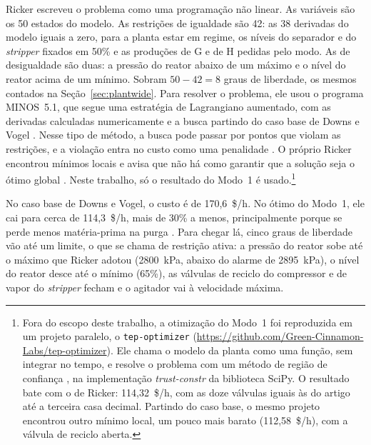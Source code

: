 \begin{figure}[htbp]
	\label{fig:otimizar}
\end{figure}

Ricker escreveu o problema como uma programação não linear. As variáveis são os 50 estados do modelo. As restrições de igualdade são 42: as 38 derivadas do modelo iguais a zero, para a planta estar em regime, os níveis do separador e do \textit{stripper} fixados em 50\% e as produções de G e de H pedidas pelo modo. As de desigualdade são duas: a pressão do reator abaixo de um máximo e o nível do reator acima de um mínimo. Sobram $50 - 42 = 8$ graus de liberdade, os mesmos contados na Seção~\ref{sec:plantwide}. Para resolver o problema, ele usou o programa MINOS~5.1, que segue uma estratégia de Lagrangiano aumentado, com as derivadas calculadas numericamente e a busca partindo do caso base de Downs e Vogel \cite{Ricker1995}. Nesse tipo de método, a busca pode passar por pontos que violam as restrições, e a violação entra no custo como uma penalidade \cite{Nocedal1999}. O próprio Ricker encontrou mínimos locais e avisa que não há como garantir que a solução seja o ótimo global \cite{Ricker1995}. Neste trabalho, só o resultado do Modo~1 é usado.\footnote{Fora do escopo deste trabalho, a otimização do Modo~1 foi reproduzida em um projeto paralelo, o \texttt{tep-optimizer} (\url{https://github.com/Green-Cinnamon-Labs/tep-optimizer}). Ele chama o modelo da planta como uma função, sem integrar no tempo, e resolve o problema com um método de região de confiança \cite{Nocedal1999}, na implementação \textit{trust-constr} da biblioteca SciPy. O resultado bate com o de Ricker: 114,32~\$/h, com as doze válvulas iguais às do artigo até a terceira casa decimal. Partindo do caso base, o mesmo projeto encontrou outro mínimo local, um pouco mais barato (112,58~\$/h), com a válvula de reciclo aberta.}

No caso base de Downs e Vogel, o custo é de 170,6~\$/h. No ótimo do Modo~1, ele cai para cerca de 114,3~\$/h, mais de 30\% a menos, principalmente porque se perde menos matéria-prima na purga \cite{Ricker1995}. Para chegar lá, cinco graus de liberdade vão até um limite, o que se chama de restrição ativa: a pressão do reator sobe até o máximo que Ricker adotou (2800~kPa, abaixo do alarme de 2895~kPa), o nível do reator desce até o mínimo (65\%), as válvulas de reciclo do compressor e de vapor do \textit{stripper} fecham e o agitador vai à velocidade máxima. 

